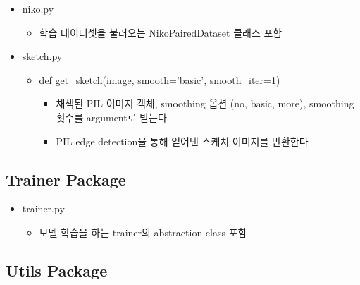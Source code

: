\begin{itemize}
	\item niko.py
	\begin{itemize}
		\item 학습 데이터셋을 불러오는 NikoPairedDataset 클래스 포함
	\end{itemize}
	\item sketch.py
	\begin{itemize}
		\item def get\_sketch(image, smooth='basic', smooth\_iter=1)
		\begin{itemize}
			\item 채색된 PIL 이미지 객체, smoothing 옵션 (no, basic, more), smoothing 횟수를 argument로 받는다
			\item PIL edge detection을 통해 얻어낸 스케치 이미지를 반환한다
		\end{itemize}
	\end{itemize}
\end{itemize}


\subsection*{Trainer Package}
\begin{itemize}
	\item trainer.py
	\begin{itemize}
		\item 모델 학습을 하는 trainer의 abstraction class 포함
	\end{itemize}
\end{itemize}


\subsection*{Utils Package}

